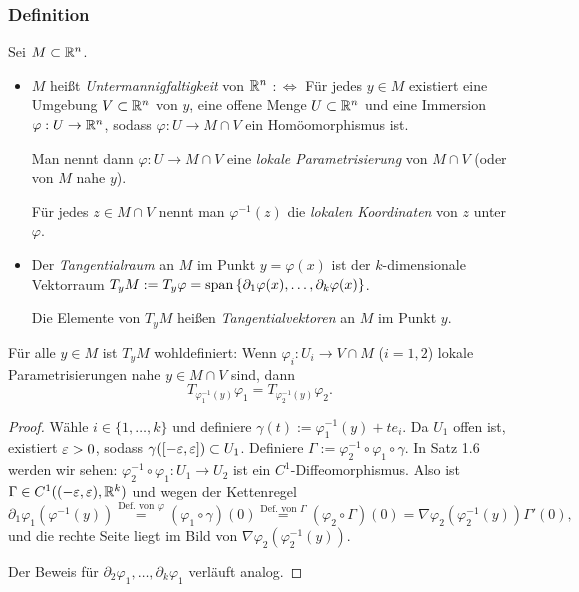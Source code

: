 \subsubsection{Definition}
Sei $M \subset \mathbb{R}^n$.
\begin{itemize}
  \item $M$ heißt \emph{Untermannigfaltigkeit} von $\mathbb{R}^n$ $:\Leftrightarrow$ Für jedes $y \in M$ existiert eine Umgebung $V \subset \mathbb{R}^n$ von $y$, eine offene Menge $U \subset \mathbb{R}^n$ und eine Immersion $\varphi: U \to \mathbb{R}^n$, sodass $\varphi: U \to M \cap V$ ein Homöomorphismus ist.
  
  Man nennt dann $\varphi: U \to M \cap V$ eine \emph{lokale Parametrisierung} von $M \cap V$ (oder von $M$ nahe $y$). 
  
  Für jedes $z \in M \cap V$ nennt man $\varphi^{-1}(z)$ die \emph{lokalen Koordinaten} von $z$ unter $\varphi$.
  \item Der \emph{Tangentialraum} an $M$ im Punkt $y = \varphi(x)$ ist der $k$-dimensionale Vektorraum $T_y M := T_y \varphi = \mathrm{span}\, \{ \partial_1 \varphi(x), \ldots, \partial_k \varphi(x) \}$. 
  
  Die Elemente von $T_y M$ heißen \emph{Tangentialvektoren} an $M$ im Punkt $y$.
\end{itemize}

\begin{rmrk}
 Für alle $y \in M$ ist $T_y M$ wohldefiniert: Wenn $\varphi_i: U_i \to V \cap M$ ($i = 1,2$) lokale Parametrisierungen nahe $y \in M \cap V$ sind, dann
 \[ T_{\varphi^{-1}_1(y)} \varphi_1 = T_{\varphi^{-1}_2(y)} \varphi_2. \]
\end{rmrk}

\begin{proof}
 Wähle $i \in \{1, \ldots, k\}$ und definiere $\gamma(t) := \varphi_1^{-1}(y) + t e_i$.
 Da $U_1$ offen ist, existiert $\varepsilon > 0$, sodass $\gamma( [-\varepsilon, \varepsilon] ) \subset U_1$. Definiere $\Gamma := \varphi_2^{-1} \circ \varphi_1 \circ \gamma$. In Satz 1.6 werden wir sehen: $\varphi_2^{-1} \circ \varphi_1: U_1 \to U_2$ ist ein $C^1$-Diffeomorphismus. Also ist $\Gamma \in C^1( (-\varepsilon,\varepsilon), \mathbb{R}^k)$ und wegen der Kettenregel
 \[ \partial_1 \varphi_1 ( \varphi^{-1} (y) ) \overset{\text{Def. von } \varphi}{=} (\varphi_1 \circ \gamma) (0) \overset{\text{Def. von } \Gamma}{=} (\varphi_2 \circ \Gamma) (0) = \nabla \varphi_2( \varphi_2^{-1}(y) ) \Gamma'(0), \]
 und die rechte Seite liegt im Bild von $\nabla \varphi_2( \varphi_2^{-1}(y) )$.
 
 Der Beweis für $\partial_2 \varphi_1, \ldots, \partial_k \varphi_1$ verläuft analog.
\end{proof}

